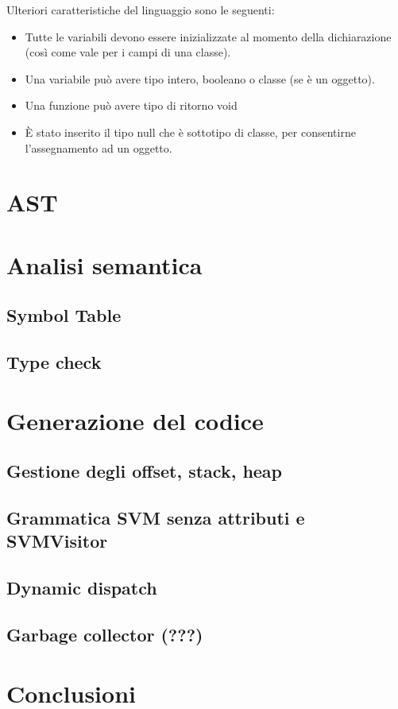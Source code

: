 \documentclass[a4paper]{article}   %
\begin{document}
Ulteriori caratteristiche del linguaggio sono le seguenti:\\
\begin{itemize}
  \item Tutte le variabili devono essere inizializzate al momento della dichiarazione (così come vale
 per i campi di una classe).
  \item Una variabile può avere tipo intero, booleano o classe (se è un oggetto).
  \item Una funzione può avere tipo di ritorno void
  \item È stato inserito il tipo null che è sottotipo di classe, per consentirne l'assegnamento ad un oggetto.

\end{itemize}

\section{AST}

\section{Analisi semantica}

\subsection{Symbol Table}
\subsection{Type check}

\section{Generazione del codice}

\subsection{Gestione degli offset, stack, heap}
\subsection{Grammatica SVM senza attributi e SVMVisitor}
\subsection{Dynamic dispatch}
\subsection{Garbage collector (???)}

\section{Conclusioni}

\begin{thebibliography}{9}
\end{thebibliography}
\end{document}
